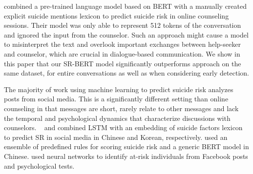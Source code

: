 \documentclass[letterpaper]{article} %
\begin{document}
\citet{amir}  combined a pre-trained language model based on BERT \cite{devlin2018bert} with a manually created explicit suicide mentions lexicon to predict suicide risk in online counseling sessions. Their model was only able to represent 512 tokens of the conversation and ignored the input from the counselor. 
Such an approach might cause a model to misinterpret the text and overlook important exchanges between help-seeker and counselor, which are crucial in dialogue-based communication. 
We show in this paper that our  SR-BERT model significantly outperforms \citet{amir} approach on the same dataset, for entire conversations as well as when considering early detection. 
 
 

The majority of work using machine learning to predict  suicide risk analyzes posts from social media. 
This is a significantly  different setting than online counseling  in that  messages  are short, rarely relate to other messages and lack the  temporal and psychological dynamics that characterize discussions with counselors.
~\citet{caoLatentSuicideRisk2019} and \citet{lee2020cross}  combined  LSTM  with an embedding of  suicide factors lexicon to predict SR in social media in Chinese and Korean, respectively.  
\citet{wangMedicalLevelSuicideRisk2021}  used an ensemble of predefined rules for scoring suicide risk  and a generic BERT model in Chinese.    
 \citet{ophirDeepNeuralNetworks2020} used neural networks to identify at-risk individuals from Facebook posts and psychological tests. 
 
\end{document}
